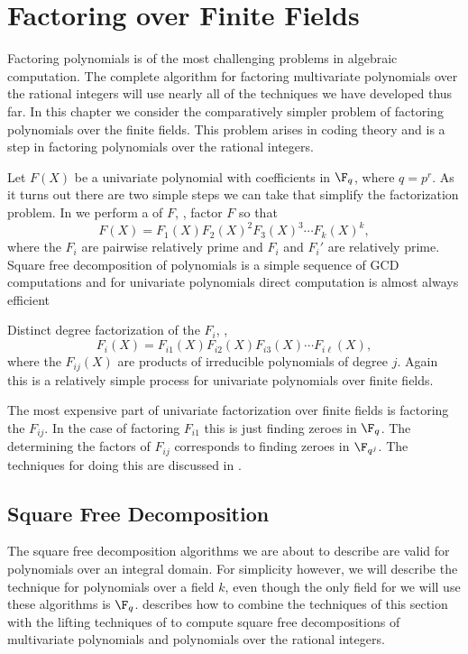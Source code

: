 
\chapter{Factoring over Finite Fields}
\label{Poly:FF:Factor:Chap}

Factoring polynomials is of the most challenging problems in algebraic
computation.  The complete algorithm for factoring multivariate
polynomials over the rational integers will use nearly all of the
techniques we have developed thus far.  In this chapter we consider
the comparatively simpler problem of factoring polynomials over the
finite fields.  This problem arises in coding theory and is a step in
factoring polynomials over the rational integers.

Let $F(X)$ be a univariate polynomial with coefficients in $\F_q$,
where $q=p^r$.  As it turns out there are two simple steps we can take
that simplify the factorization problem.  In 
we perform a  of $F$, \ie, factor $F$
so that
\[
F(X) = F_1(X) F_2(X)^2 F_3(X)^3 \cdots F_k(X)^k,
\]
where the $F_i$ are pairwise relatively prime and $F_i$ and $F_i'$ are
relatively prime.  Square free decomposition of polynomials is a
simple sequence of GCD computations and for univariate polynomials
direct computation is almost always efficient

Distinct degree factorization of the $F_i$, \ie,
\[
F_i(X) = F_{i1}(X) F_{i2}(X) F_{i3}(X) \cdots F_{i\ell}(X),
\]
where the $F_{ij}(X)$ are products of irreducible polynomials of
degree $j$.  Again this is a relatively simple process for univariate
polynomials over finite fields.


The most expensive part of univariate factorization over finite fields
is factoring the $F_{ij}$.  In the case of factoring $F_{i1}$ this is
just finding zeroes in $\F_q$.  The determining the factors of
$F_{ij}$ corresponds to finding zeroes in $\F_{q^j}$.  The techniques
for doing this are discussed in \sectref{}.

\section{Square Free Decomposition}
\label{FFac:Sqfr:Sec}

The square free decomposition algorithms we are about to describe are
valid for polynomials over an integral domain.  For simplicity
however, we will describe the technique for polynomials over a field
$k$, even though the only field for we will use these algorithms is
$\F_q$.   describes how to combine the
techniques of this section with the lifting techniques of
 to compute square free decompositions of
multivariate polynomials and polynomials over the rational integers.

